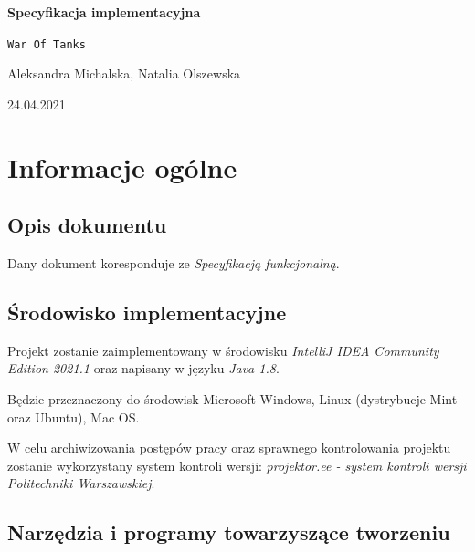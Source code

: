\documentclass[a4paper]{article}
\begin{document}
\begin{titlepage}
    \begin{center}
        \vspace*{5cm}

            \Huge
            \textbf{Specyfikacja implementacyjna}

            \vspace{1cm}
            \Huge
            \texttt{War Of Tanks}

            \vspace{1.5cm}

            \large
            Aleksandra Michalska, Natalia Olszewska

            \vfill

            \vspace{3cm}

        \large 24.04.2021
    \end{center}
\end{titlepage}

\tableofcontents

\newpage

\section{Informacje og\'olne}

\subsection{Opis dokumentu}
\quad Dany dokument koresponduje ze \textit{Specyfikacj\k{a} funkcjonaln\k{a}}.

\subsection{\'Srodowisko implementacyjne}
\quad Projekt zostanie zaimplementowany w środowisku \textit{IntelliJ IDEA Community Edition 2021.1} oraz napisany w j\k{e}zyku \textit{Java 1.8}.

B\k{e}dzie przeznaczony do \'srodowisk Microsoft Windows, Linux (dystrybucje Mint oraz Ubuntu), Mac OS. 

W celu archiwizowania post\k{e}p\'ow pracy oraz sprawnego kontrolowania projektu zostanie wykorzystany system kontroli wersji: \textit{projektor.ee - system kontroli wersji Politechniki Warszawskiej}.

\subsection{Narz\k{e}dzia i programy towarzysz\k{a}ce tworzeniu}
\end{document}
